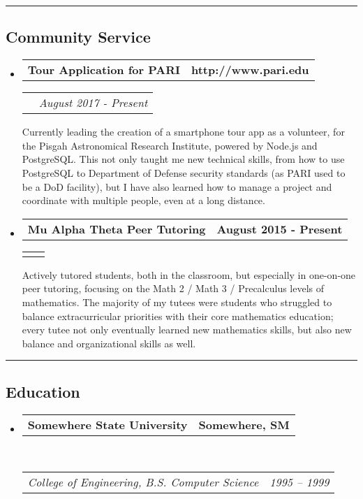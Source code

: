 \documentclass[10pt,letterpaper]{article}
\makeatletter
\newcommand{\headerrow}[2]
{\begin{tabular*}{\linewidth}{l@{\extracolsep{\fill}}r}
	#1 &
	#2 \\
\end{tabular*}}
\newcommand{\basicitem}[5]
{
	\item
	\headerrow
		{\textbf{#1}}
		{\textbf{#2}}
	\ifthenelse{\equal{#3}{} \AND \equal{#4}{}}
		{}
		{
			\headerrow
			{\emph{#3}}
			{\emph{#4}}
		}
	#5
}
\makeatother
\begin{document}
\hrule
\vspace{-0.4em}
\subsection*{Community Service}
\begin{itemize}
	\parskip=0.1em

	\basicitem
		{Tour Application for PARI}
		{http://www.pari.edu}
		{}
		{August 2017 - Present}
		{Currently leading the creation of a smartphone tour app as a volunteer, for the Pisgah Astronomical Research Institute, powered by Node.js and PostgreSQL. This not only taught me new technical skills, from how to use PostgreSQL to Department of Defense security standards (as PARI used to be a DoD facility), but I have also learned how to manage a project and coordinate with multiple people, even at a long distance.}

	\basicitem
		{Mu Alpha Theta Peer Tutoring}
		{August 2015 - Present}
		{}
		{}
		{Actively tutored students, both in the classroom, but especially in one-on-one peer tutoring, focusing on the Math 2 / Math 3 / Precalculus levels of mathematics. The majority of my tutees were students who struggled to balance extracurricular priorities with their core mathematics education; every tutee not only eventually learned new mathematics skills, but also new balance and organizational skills as well.}

\end{itemize}

\hrule
\vspace{-0.4em}
\subsection*{Education}

\begin{itemize}
	\parskip=0.1em

	\item 
	\headerrow
		{\textbf{Somewhere State University}}
		{\textbf{Somewhere, SM}}
	\\
	\headerrow
		{\emph{College of Engineering, B.S. Computer Science}}
		{\emph{1995 -- 1999}}

\end{itemize}
\end{document}
